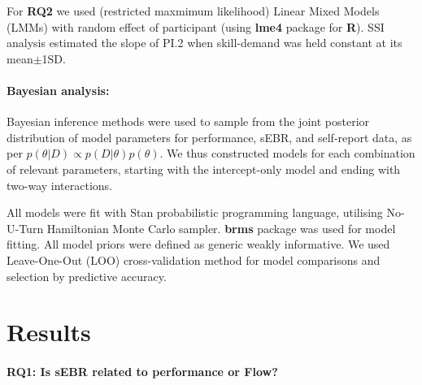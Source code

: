 \documentclass[10pt,letterpaper,floatsintext]{article}
\begin{document}
For \textbf{RQ2} we used (restricted maxmimum likelihood) Linear Mixed Models (LMMs) with random effect of participant (using {\bf lme4} package for {\bf R}). SSI analysis estimated the slope of PI.2 when skill-demand was held constant at its mean$\pm$1SD.

\paragraph{Bayesian analysis:}
Bayesian inference methods were used to sample from the joint posterior distribution of model parameters for performance, sEBR, and self-report data, as per $p(\theta|D) \propto p(D|\theta)p(\theta)$. We thus constructed models for each combination of relevant parameters, starting with the intercept-only model and ending with two-way interactions.  


All models were fit with Stan probabilistic programming language, utilising No-U-Turn Hamiltonian Monte Carlo sampler. {\bf brms} package was used for model fitting. All model priors were defined as generic weakly informative. We used Leave-One-Out (LOO) cross-validation method for model comparisons and selection by predictive accuracy.

\section{Results}

\paragraph{RQ1: Is sEBR related to performance or Flow?}
\end{document}
